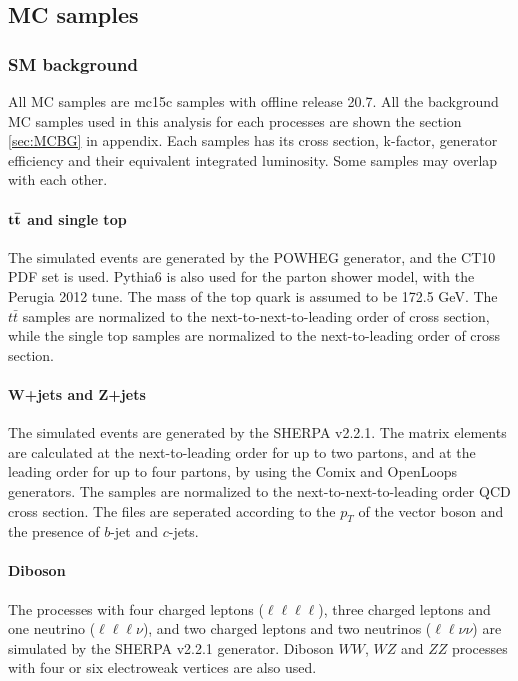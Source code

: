 \subsection{MC samples}
\subsubsection{SM background}
All MC samples are mc15c samples with offline release 20.7.
All the background MC samples used in this analysis for each processes are shown the section \ref{sec:MCBG} in appendix.
Each samples has its cross section, k-factor, generator efficiency and their equivalent integrated luminosity.
Some samples may overlap with each other.

\paragraph{$\bf t\bar{t}$ and single top}
The simulated events are generated by the {\sc POWHEG} generator, and the CT10 PDF set is used.
{\sc Pythia6} is also used for the parton shower model, with the {\sc Perugia} 2012 tune.
The mass of the top quark is assumed to be 172.5 GeV.
The $t\bar{t}$ samples are normalized to the next-to-next-to-leading order of cross section, while the single top samples are normalized to the next-to-leading order of cross section.

\paragraph{\bf W+jets and Z+jets}
The simulated events are generated by the {\sc SHERPA} v2.2.1.
The matrix elements are calculated at the next-to-leading order for up to two partons, and at the leading order for up to four partons, by using the {\sc Comix} and {\sc OpenLoops} generators.
The samples are normalized to the next-to-next-to-leading order QCD cross section.
The files are seperated according to the $p_T$ of the vector boson and the presence of $b$-jet and $c$-jets.

\paragraph{\bf Diboson}
The processes with four charged leptons ($\ell \ell \ell \ell$), three charged leptons and one neutrino ($\ell \ell \ell \nu$), and two charged leptons and two neutrinos ($\ell \ell \nu \nu$) are simulated by the {\sc SHERPA} v2.2.1 generator.
Diboson $WW$, $WZ$ and $ZZ$ processes with four or six electroweak vertices are also used.

